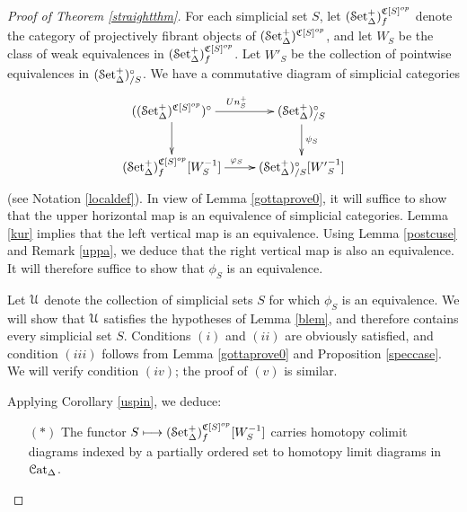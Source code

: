\begin{proof}[Proof of Theorem \ref{straightthm}]
For each simplicial set $S$, let $(\operatorname{\mathcal{S}et_{\Delta}^{+}})^{\operatorname{\mathfrak{C}}[S]^{op}}_{f}$ denote the
category of projectively fibrant objects of $(\operatorname{\mathcal{S}et_{\Delta}^{+}})^{\operatorname{\mathfrak{C}}[S]^{op}}$, and let
$W_{S}$ be the class of weak equivalences in $( \operatorname{\mathcal{S}et_{\Delta}^{+}})^{\operatorname{\mathfrak{C}}[S]^{op}}_{f}$.
Let $W'_{S}$ be the collection of pointwise equivalences in $(\operatorname{\mathcal{S}et_{\Delta}^{+}})_{/S}^{\circ}$.
We have a commutative diagram of simplicial categories
$$ \xymatrix{ ((\mSet)^{\sCoNerve[S]^{op}})^{\degree} \ar[r]^{ \Un^{+}_{S} } \ar[d] &
(\mSet)_{/S}^{\degree} \ar[d]^{\psi_{S}} \\
( \mSet)^{\sCoNerve[S]^{op}}_{f}[W_{S}^{-1} ] \ar[r]^{\phi_S} & ( \mSet)_{/S}^{\degree}[ {W'}^{-1}_{S} ] }$$ (see Notation \ref{localdef}). In view of Lemma \ref{gottaprove0}, it will suffice to show
that the upper horizontal map is an equivalence of simplicial categories.
Lemma \ref{kur} implies that the left vertical map is an equivalence.
Using Lemma \ref{postcuse} and Remark \ref{uppa}, we deduce that the right vertical
map is also an equivalence. It will therefore suffice to show that $\phi_{S}$ is an equivalence. 

Let $\operatorname{\mathcal{U}}$ denote the collection of simplicial sets $S$ for which $\phi_{S}$ is an equivalence.
We will show that $\operatorname{\mathcal{U}}$ satisfies the hypotheses of Lemma \ref{blem}, and therefore contains every simplicial set $S$. Conditions $(i)$ and $(ii)$ are obviously satisfied, and
condition $(iii)$ follows from Lemma \ref{gottaprove0} and Proposition \ref{speccase}.
We will verify condition $(iv)$; the proof of $(v)$ is similar.

Applying Corollary \ref{uspin}, we deduce:
\begin{itemize}
\item[$(\ast)$] The functor $S \longmapsto ( \operatorname{\mathcal{S}et_{\Delta}^{+}})^{\operatorname{\mathfrak{C}}[S]^{op}}_{f} [W_S^{-1}]$ carries homotopy colimit diagrams indexed by a partially ordered set to homotopy limit diagrams in $\operatorname{\mathcal{C}at_{\Delta}}$.
\end{itemize}


\end{proof}

